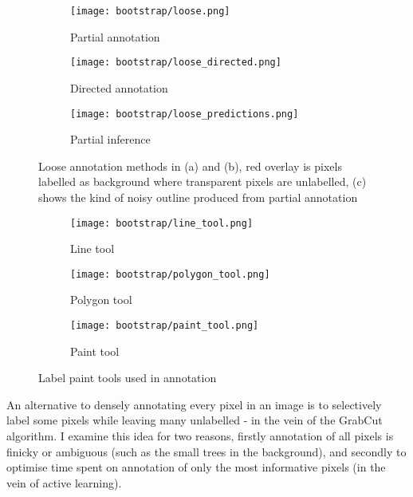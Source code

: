 \begin{figure*}[!ht]
\centering
\begin{subfigure}[t]{.33\textwidth}
  \centering
  \texttt{[image: bootstrap/loose.png]}
  \caption{Partial annotation}
  \label{fig:bootstrap_loose_annot}
\end{subfigure}%
\begin{subfigure}[t]{.33\textwidth}
  \centering
  \texttt{[image: bootstrap/loose\_directed.png]}
  \caption{Directed annotation}
  \label{fig:bootstrap_loose_dir}

\end{subfigure}%
\begin{subfigure}[t]{.33\textwidth}
  \centering
  \texttt{[image: bootstrap/loose\_predictions.png]}
  \caption{Partial inference}
  \label{fig:bootstrap_loose_pred}
\end{subfigure}
  \caption{Loose annotation methods in (a) and (b), red overlay is pixels labelled as background where transparent pixels are unlabelled, (c) shows the kind of noisy outline produced from partial annotation }


\end{figure*}

\begin{figure}
\centering
\begin{subfigure}[t]{.33\textwidth}
  \centering
  \texttt{[image: bootstrap/line\_tool.png]}
  \caption{Line tool}
\end{subfigure}%
\begin{subfigure}[t]{.33\textwidth}
  \centering
  \texttt{[image: bootstrap/polygon\_tool.png]}
  \caption{Polygon tool}
\end{subfigure}%
\begin{subfigure}[t]{.33\textwidth}
  \centering
  \texttt{[image: bootstrap/paint\_tool.png]}
  \caption{Paint tool}
\end{subfigure}%

  \caption{Label paint tools used in annotation}
  \label{fig:bootstrap_tools}

\end{figure}



An alternative to densely annotating every pixel in an image is to selectively label some pixels while leaving many unlabelled - in the vein of the GrabCut algorithm. I examine this idea for two reasons, firstly annotation of all pixels is finicky or ambiguous (such as the small trees in the background), and secondly to optimise time spent on annotation of only the most informative pixels (in the vein of active learning).


